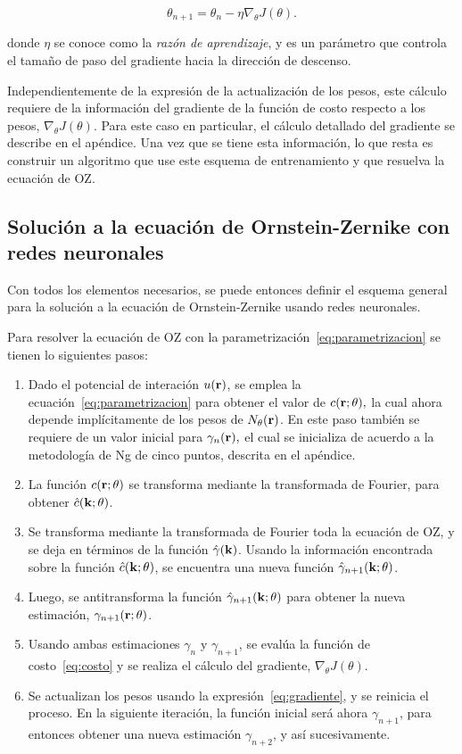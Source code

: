 \begin{equation}
    \theta_{n+1} = \theta_n - \eta \nabla_{\theta} J(\theta) .
    \label{eq:gradiente}
\end{equation}

donde $\eta$ se conoce como la \emph{razón de aprendizaje}, y es un parámetro que controla
el tamaño de paso del gradiente hacia la dirección de descenso.

Independientemente de la expresión de la actualización de los pesos, este cálculo
requiere de la información del gradiente de la función de costo respecto a los pesos,
$\nabla_{\theta} J(\theta)$.
Para este caso en particular, el cálculo detallado del gradiente se describe en el apéndice.
Una vez que se tiene esta información, lo que resta es construir un algoritmo que use
este esquema de entrenamiento y que resuelva la ecuación de OZ.

\subsection{Solución a la ecuación de Ornstein-Zernike con redes neuronales}
Con todos los elementos necesarios, se puede entonces definir el esquema general para
la solución a la ecuación de Ornstein-Zernike usando redes neuronales.

Para resolver la ecuación de OZ con la parametrización~\eqref{eq:parametrizacion} se tienen lo siguientes pasos:

\begin{enumerate}
    \item Dado el potencial de interación $u(\mathbf{r})$, se emplea la ecuación~\eqref{eq:parametrizacion} para obtener el valor de $c(\mathbf{r}; \theta),$ la cual ahora depende implícitamente de los pesos de $N_{\theta}(\mathbf{r})$. En este paso también se requiere de un valor inicial para $\gamma_{n}(\mathbf{r}),$ el cual se inicializa de acuerdo a la metodología de Ng de cinco puntos, descrita en el apéndice. %
    \item La función $c(\mathbf{r}; \theta)$ se transforma mediante la transformada de Fourier, para obtener $\hat{c}(\mathbf{k}; \theta)$.
    \item Se transforma mediante la transformada de Fourier toda la ecuación de OZ, y se deja en términos de la función $\hat{\gamma}(\mathbf{k})$. Usando la información encontrada sobre la función $\hat{c}(\mathbf{k}; \theta)$, se encuentra una nueva función $\hat{\gamma}_{n+1}(\mathbf{k}; \theta)$.
    \item Luego, se antitransforma la función $\hat{\gamma}_{n+1}(\mathbf{k}; \theta)$ para obtener la nueva estimación, $\gamma_{n+1}(\mathbf{r}; \theta)$.
    \item Usando ambas estimaciones $\gamma_{n}$ y $\gamma_{n+1}$, se evalúa la función de costo~\eqref{eq:costo} y se realiza el cálculo del gradiente, $\nabla_{\theta} J(\theta)$.
    \item Se actualizan los pesos usando la expresión~\eqref{eq:gradiente}, y se reinicia el proceso. En la siguiente iteración, la función inicial será ahora $\gamma_{n+1}$, para entonces obtener una nueva estimación $\gamma_{n+2}$, y así sucesivamente.
\end{enumerate}

